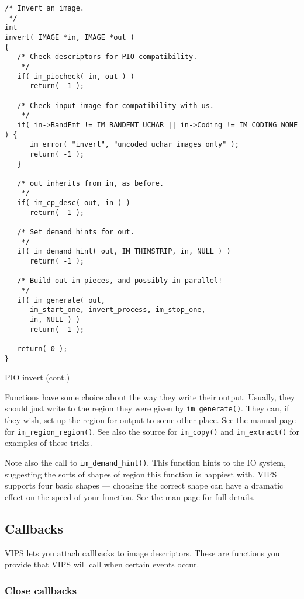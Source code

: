 \begin{fig2}
\begin{verbatim}
/* Invert an image.
 */
int
invert( IMAGE *in, IMAGE *out )
{
   /* Check descriptors for PIO compatibility.
    */
   if( im_piocheck( in, out ) )
      return( -1 );

   /* Check input image for compatibility with us.
    */
   if( in->BandFmt != IM_BANDFMT_UCHAR || in->Coding != IM_CODING_NONE ) {
      im_error( "invert", "uncoded uchar images only" );
      return( -1 );
   }

   /* out inherits from in, as before.
    */
   if( im_cp_desc( out, in ) )
      return( -1 );

   /* Set demand hints for out.
    */
   if( im_demand_hint( out, IM_THINSTRIP, in, NULL ) )
      return( -1 );

   /* Build out in pieces, and possibly in parallel!
    */
   if( im_generate( out,
      im_start_one, invert_process, im_stop_one,
      in, NULL ) )
      return( -1 );

   return( 0 );
}    
\end{verbatim}
\caption{PIO invert (cont.)}
\end{fig2}

Functions have some choice about the way they write their output. Usually, they
should just write to the region they were given by \verb+im_generate()+. They
can, if they wish, set up the region for output to some other place. See
the manual page for \verb+im_region_region()+.  See also the source for
\verb+im_copy()+ and \verb+im_extract()+ for examples of these tricks.

Note also the call to \verb+im_demand_hint()+. This function hints to the IO
system, suggesting the sorts of shapes of region this function is happiest
with. VIPS supports four basic shapes --- choosing the correct shape can
have a dramatic effect on the speed of your function. See the man page for
full details.

\subsection{Callbacks}
\label{sec:callback}

VIPS lets you attach callbacks to image descriptors. These are functions
you provide that VIPS will call when certain events occur. 

\subsubsection{Close callbacks}

